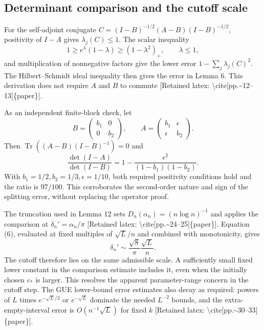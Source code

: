\documentclass[10pt]{article}
\begin{document}
\subsection*{Determinant comparison and the cutoff scale}
For the self-adjoint conjugate \(C=(I-B)^{-1/2}(A-B)(I-B)^{-1/2}\), positivity of \(I-A\) gives \(\lambda_j(C)\leq1\). The scalar inequality \[1\geq e^\lambda(1-\lambda)\geq(1-\lambda^2)_+,\qquad \lambda\leq1,\] and multiplication of nonnegative factors give the lower error \(1-\sum_j\lambda_j(C)^2\). The Hilbert–Schmidt ideal inequality then gives the error in Lemma 6. This derivation does not require \(A\) and \(B\) to commute [Retained latex: \textbackslash{}cite[pp.\textasciitilde{}12--13]\{paper\}].\par
As an independent finite-block check, let \[B=\begin{pmatrix}b_1&0\\0&b_2\end{pmatrix},\qquad
A=\begin{pmatrix}b_1&\epsilon\\\epsilon&b_2\end{pmatrix}.\] Then \(\operatorname{Tr}((A-B)(I-B)^{-1})=0\) and \[\frac{\det(I-A)}{\det(I-B)}
=1-\frac{\epsilon^2}{(1-b_1)(1-b_2)}.\] With \(b_1=1/2,b_2=1/3,\epsilon=1/10\), both required positivity conditions hold and the ratio is \(97/100\). This corroborates the second-order nature and sign of the splitting error, without replacing the operator proof.\par
The truncation used in Lemma 12 sets \(D_n(\alpha_n)=(n\log n)^{-1}\) and applies the comparison at \(\delta_n'=\alpha_n/\pi\) [Retained latex: \textbackslash{}cite[pp.\textasciitilde{}24--25]\{paper\}]. Equation (6), evaluated at fixed multiples of \(\sqrt{L}/n\) and combined with monotonicity, gives \[\delta_n'\sim \frac{\sqrt8}{\pi}\frac{\sqrt L}{n}.\] The cutoff therefore lies on the same admissible scale. A sufficiently small fixed lower constant in the comparison estimate includes it, even when the initially chosen \(c_*\) is larger. This resolves the apparent parameter-range concern in the cutoff step. The GUE lower-bound error estimates also decay as required: powers of \(L\) times \(e^{-\sqrt L/2}\) or \(e^{-\sqrt L}\) dominate the needed \(L^{-2}\) bounds, and the extra-empty-interval error is \(O(n^{-1}\sqrt L)\) for fixed \(k\) [Retained latex: \textbackslash{}cite[pp.\textasciitilde{}30--33]\{paper\}].\par
\end{document}
